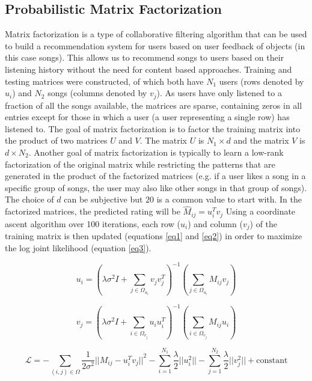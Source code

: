 \documentclass[11pt,preprint]{aastex}
\newcommand{\TRANSPOSE}{\ensuremath{T}}
\begin{document}
\subsection{Probabilistic Matrix Factorization}
Matrix factorization is a type of collaborative filtering algorithm that can be used to build a recommendation system for users based on user feedback of objects (in this case songs). This allows us to recommend songs to users based on their listening history without the need for content based approaches. 
Training and testing matrices were constructed, of which both have $N_1$ users (rows denoted by $u_i$) and $N_2$ songs (columns denoted by $v_j$). As users have only listened to a fraction of all the songs available, the matrices are sparse, containing zeros in all entries except for those in which a user (a user representing a single row) has listened to. The goal of matrix factorization is to factor the training matrix into the product of two matrices $U$ and $V$.  The matrix $U$ is $N_1 \times d$ and the matrix $V$ is $d \times N_2$. Another goal of matrix factorization is typically to learn a low-rank factorization of the original matrix while restricting the patterns that are generated in the product of the factorized matrices (e.g. if a user likes a song in a specific group of songs, the user may also like other songs in that group of songs). The choice of $d$ can be subjective but $20$ is a common value to start with. In the factorized matrices, the predicted rating will be $\hat{M}_{ij} = u_i^\TRANSPOSE  v_j$
Using a coordinate ascent algorithm over 100 iterations, each row ($u_i$) and column ($v_j$) of the training matrix is then updated (equations \ref{eq1} and \ref{eq2}) in order to maximize the log joint likelihood (equation \ref{eq3}).

\begin{equation}
u_i = \left( \lambda\sigma^2 I + \sum_{j \in \Omega_{u_i}} v_j v_j^\TRANSPOSE \right)^{-1}\left(\sum_{j \in \Omega_{u_i}} M_{ij} v_{j} \right)
\label{eq1}
\end{equation}

\begin{equation}
v_j = \left( \lambda\sigma^2 I + \sum_{i \in \Omega_{v_j}} u_i u_i^\TRANSPOSE  \right)^{-1}\left(\sum_{i \in \Omega_{v_j}} M_{ij} u_{i} \right)
\label{eq2}
\end{equation}

\begin{equation}
\mathcal{L} = - \sum_{(i,j) \in \Omega} \frac{1}{2\sigma^2} {|| M_{ij} - u_i^\TRANSPOSE  v_j||}^2 - \sum_{i=1}^{N_1} \frac{\lambda}{2} ||u_i^2 || - \sum_{j=1}^{N_2} \frac{\lambda}{2} ||v_j^2 || + \text{constant}
\label{eq3} 
\end{equation}
\end{document}

